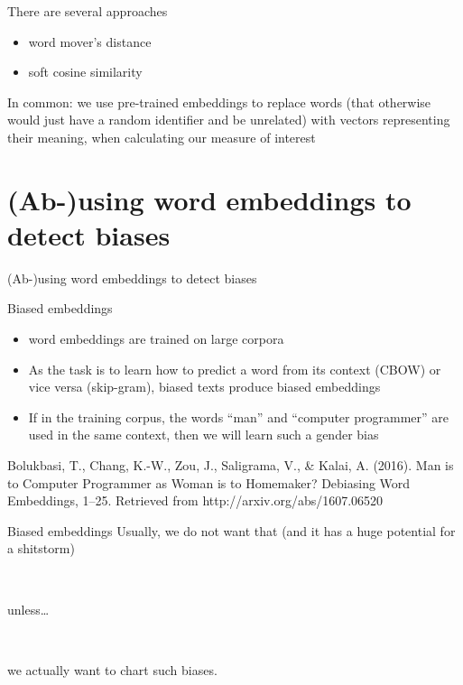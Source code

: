 \documentclass[compress]{beamer}
\begin{document}
\begin{frame}{There are several approaches}
	\begin{itemize}
		\item word mover's distance
		\item soft cosine similarity
	\end{itemize}
	In common: we use pre-trained embeddings to replace words (that otherwise would just have a random identifier and be unrelated) with vectors representing their meaning, when calculating our measure of interest
\end{frame}


\section[Detecting biases]{(Ab-)using word embeddings to detect biases}
\begin{frame}[plain]
	(Ab-)using word embeddings to detect biases
\end{frame}

\begin{frame}{Biased embeddings}
	\begin{itemize}
		\item word embeddings are trained on large corpora
		\item As the task is to learn how to predict a word from its context (CBOW) or vice versa (skip-gram), biased texts produce biased embeddings
		\item If in the training corpus, the words ``man'' and ``computer programmer'' are used in the same context, then we will learn such a gender bias
	\end{itemize}
	
	\tiny{Bolukbasi, T., Chang, K.-W., Zou, J., Saligrama, V., \& Kalai, A. (2016). Man is to Computer Programmer as Woman is to Homemaker? Debiasing Word Embeddings, 1–25. Retrieved from http://arxiv.org/abs/1607.06520}
\end{frame}


\begin{frame}{Biased embeddings}
	Usually, we do not want that (and it has a huge potential for a shitstorm)
	
	~\\
	\pause
	
	unless\ldots
	
	~\\
	\pause
	
	we actually want to chart such biases.
	
\end{frame}
\end{document}
